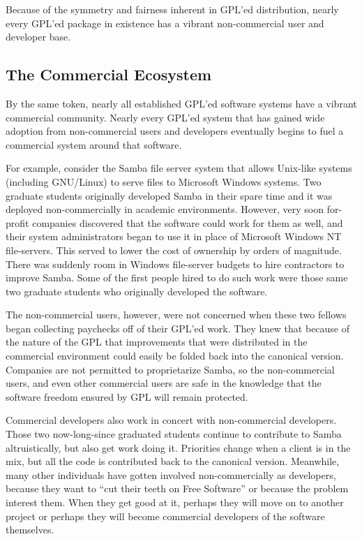 \documentclass[12pt]{report}
\begin{document}
Because of the symmetry and fairness inherent in GPL'ed distribution,
nearly every GPL'ed package in existence has a vibrant non-commercial user
and developer base.

\subsection{The Commercial Ecosystem}

By the same token, nearly all established GPL'ed software systems have a
vibrant commercial community.  Nearly every GPL'ed system that has gained
wide adoption from non-commercial users and developers eventually begins
to fuel a commercial system around that software.

For example, consider the Samba file server system that allows Unix-like
systems (including GNU/Linux) to serve files to Microsoft Windows systems.
Two graduate students originally developed Samba in their spare time and
it was deployed non-commercially in academic environments.  However, very
soon for-profit companies discovered that the software could work for them
as well, and their system administrators began to use it in place of
Microsoft Windows NT file-servers.  This served to lower the cost of
ownership by orders of magnitude.  There was suddenly room in Windows
file-server budgets to hire contractors to improve Samba.  Some of the first
people hired to do such work were those same two graduate students who
originally developed the software.

The non-commercial users, however, were not concerned when these two
fellows began collecting paychecks off of their GPL'ed work.  They knew
that because of the nature of the GPL that improvements that were
distributed in the commercial environment could easily be folded back into
the canonical version.  Companies are not permitted to proprietarize
Samba, so the non-commercial users, and even other commercial users are
safe in the knowledge that the software freedom ensured by GPL will remain
protected.

Commercial developers also work in concert with non-commercial developers.
Those two now-long-since graduated students continue to contribute to
Samba altruistically, but also get work doing it.  Priorities change when a
client is in the mix, but all the code is contributed back to the
canonical version.  Meanwhile, many other individuals have gotten involved
non-commercially as developers, because they want to ``cut their teeth on
Free Software'' or because the problem interest them.  When they get good
at it, perhaps they will move on to another project or perhaps they will
become commercial developers of the software themselves.
\end{document}
